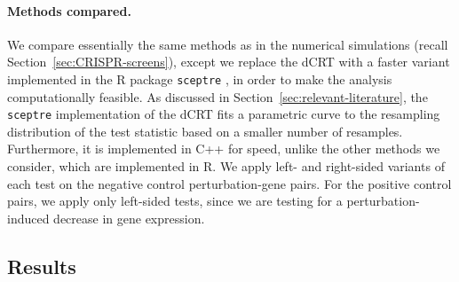 \documentclass[12pt]{article}
\theoremstyle{definition}
\begin{document}
  \paragraph{Methods compared.} We compare essentially the same methods as in the numerical simulations (recall Section~\ref{sec:CRISPR-screens}), except we replace the dCRT with a faster variant implemented in the R package \verb|sceptre| \citep{Katsevich2020c,Barry2024}, in order to make the analysis computationally feasible. As discussed in Section~\ref{sec:relevant-literature}, the \verb|sceptre| implementation of the dCRT fits a parametric curve to the resampling distribution of the test statistic based on a smaller number of resamples. Furthermore, it is implemented in C++ for speed, unlike the other methods we consider, which are implemented in R. We apply left- and right-sided variants of each test on the negative control perturbation-gene pairs. For the positive control pairs, we apply only left-sided tests, since we are testing for a perturbation-induced decrease in gene expression.
  
  \subsection{Results}
  
\end{document}

